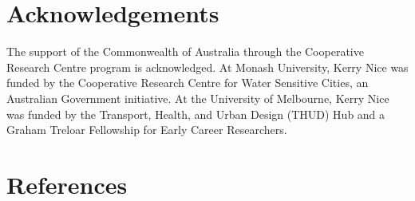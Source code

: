 \documentclass[final,3p,times,authoryear]{elsarticle}
\begin{document}

\section*{Acknowledgements}
The support of the Commonwealth of Australia through the Cooperative Research Centre program is acknowledged. At Monash University, Kerry Nice was funded by the Cooperative Research Centre for Water Sensitive Cities, an Australian Government initiative. At the University of Melbourne, Kerry Nice was funded by the Transport, Health, and Urban Design (THUD) Hub and a Graham Treloar Fellowship for Early Career Researchers.
 

\section*{References}\label{sec:ref}
   
  


%
%
%





\end{document}
